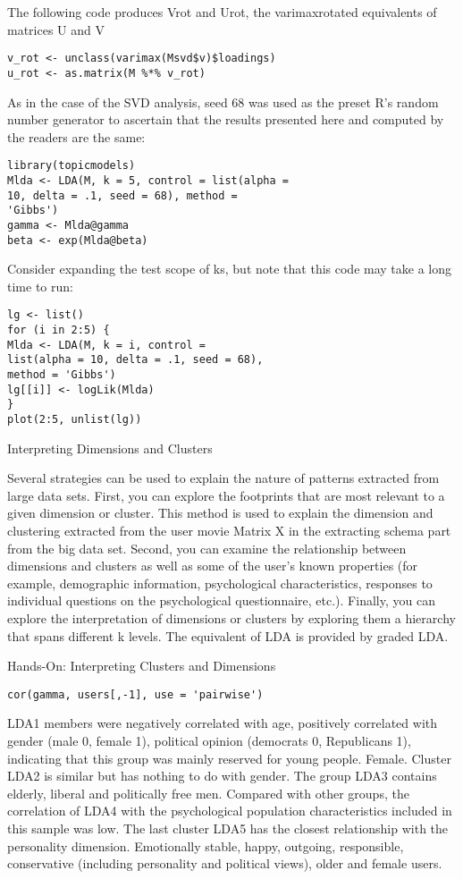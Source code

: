 The following code produces Vrot and Urot, the varimaxrotated
equivalents of matrices U and V

\begin{verbatim}
v_rot <- unclass(varimax(Msvd$v)$loadings)
u_rot <- as.matrix(M %*% v_rot)
\end{verbatim}

As in the case of the SVD analysis, seed 68 was used as the preset
 R’s random number generator to ascertain that the results 
presented here and computed by the readers are the same:

\begin{verbatim}
library(topicmodels)
Mlda <- LDA(M, k = 5, control = list(alpha =
10, delta = .1, seed = 68), method =
'Gibbs')
gamma <- Mlda@gamma
beta <- exp(Mlda@beta)
\end{verbatim}

Consider expanding the test scope of ks, but note that this code 
may take a long time to run:

\begin{verbatim}
lg <- list()
for (i in 2:5) {
Mlda <- LDA(M, k = i, control =
list(alpha = 10, delta = .1, seed = 68),
method = 'Gibbs')
lg[[i]] <- logLik(Mlda)
}
plot(2:5, unlist(lg))
\end{verbatim}

Interpreting Dimensions and Clusters

Several strategies can be used to explain the nature of patterns 
extracted from large data sets. First, you can explore the 
footprints that are most relevant to a given dimension or cluster.
 This method is used to explain the dimension and clustering 
extracted from the user movie Matrix X in the extracting schema 
part from the big data set. Second, you can examine the 
relationship between dimensions and clusters as well as some of 
the user's known properties (for example, demographic information,
 psychological characteristics, responses to individual questions 
on the psychological questionnaire, etc.). Finally, you can 
explore the interpretation of dimensions or clusters by exploring 
them a hierarchy that spans different k levels. The equivalent of 
LDA is provided by graded LDA.

Hands-On: Interpreting Clusters and Dimensions

\begin{verbatim}
cor(gamma, users[,-1], use = 'pairwise')
\end{verbatim}

LDA1 members were negatively correlated with age, positively 
correlated with gender (male 0, female 1), political opinion 
(democrats 0, Republicans 1), indicating that this group was mainly
 reserved for young people. Female. Cluster LDA2 is similar but has
 nothing to do with gender. The group LDA3 contains elderly, 
liberal and politically free men. Compared with other groups, the 
correlation of LDA4 with the psychological population 
characteristics included in this sample was low. The last cluster 
LDA5 has the closest relationship with the personality dimension. 
Emotionally stable, happy, outgoing, responsible, conservative 
(including personality and political views), older and female users.

